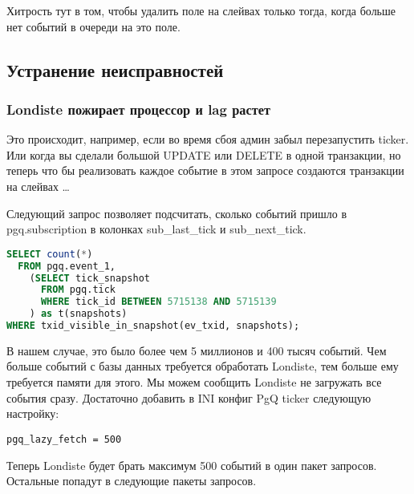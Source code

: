 Хитрость тут в том, чтобы удалить поле на слейвах только тогда, когда больше нет событий в очереди на это поле.


\subsection{Устранение неисправностей}

\subsubsection{Londiste пожирает процессор и lag растет}
Это происходит, например, если во время сбоя админ забыл перезапустить ticker. Или когда вы сделали большой UPDATE или DELETE в одной транзакции, но теперь что бы реализовать каждое событие в этом запросе создаются транзакции на слейвах \dots

Следующий запрос позволяет подсчитать, сколько событий пришло в pgq.subscription в колонках sub\_last\_tick и sub\_next\_tick.
\begin{lstlisting}[language=SQL,label=lst:londiste24,caption=Устранение неисправностей]
SELECT count(*)
  FROM pgq.event_1,
    (SELECT tick_snapshot
      FROM pgq.tick
      WHERE tick_id BETWEEN 5715138 AND 5715139
    ) as t(snapshots)
WHERE txid_visible_in_snapshot(ev_txid, snapshots);
\end{lstlisting}

В нашем случае, это было более чем 5 миллионов и 400 тысяч событий. Чем больше событий с базы данных требуется обработать Londiste, тем больше ему требуется памяти для этого. Мы можем сообщить Londiste не загружать все события сразу. Достаточно добавить в INI конфиг PgQ ticker следующую настройку:
\begin{lstlisting}[label=lst:londiste25,caption=Устранение неисправностей]
pgq_lazy_fetch = 500
\end{lstlisting}

Теперь Londiste будет брать максимум 500 событий в один пакет запросов. Остальные попадут в следующие пакеты запросов.